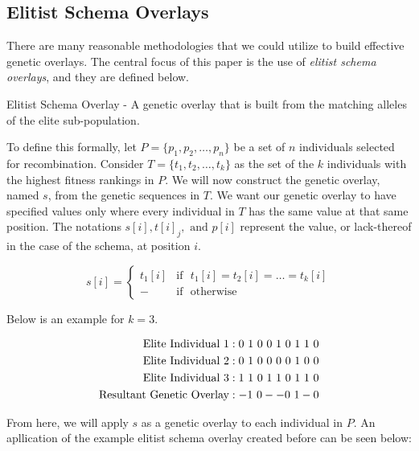 \subsection*{Elitist Schema Overlays}
There are many reasonable methodologies that we could utilize to build effective genetic overlays. The central focus of this paper is the use of \emph{elitist schema overlays}, and they are defined below.

\begin{overlay}
Elitist Schema Overlay - A genetic overlay that is built from the matching alleles of the elite sub-population.
\end{overlay}

To define this formally, let $P = \{p_1,p_2,\ldots,p_n\}$ be a set of $n$ individuals selected for recombination. Consider $T=\{t_1,t_2,\ldots,t_k\}$ as the set of the $k$ individuals with the highest fitness rankings in $P$. We will now construct the genetic overlay, named $s$, from the genetic sequences in $T$. We want our genetic overlay to  have specified values only where every individual in $T$ has the same value at that same position. The notations $s[i], t[i]_j, \text{ and } p[i]$ represent the value, or lack-thereof in the case of the schema, at position $i$. 
 
 \begin{displaymath}
   s[i] = \left\{
     \begin{array}{cl}
       t_1[i] & \text{if~ } t_1[i] = t_2[i] = \ldots = t_k[i] \\
       - & \text{if~ } \text{otherwise} 
     \end{array}
   \right.
\end{displaymath} 

\noindent Below is an example for $k = 3$.

\begin{displaymath}
\centering 
\begin{align*}
\text{Elite Individual 1} &: 0~1~0~0~1~0~1~1~0 			\\
\text{Elite Individual 2} &: 0~1~0~0~0~0~1~0~0 			\\
\text{Elite Individual 3} &: 1~1~0~1~1~0~1~1~0 			\\  
\text{Resultant Genetic Overlay} &:   -1~0--0~1-0			
\end{align*}
\end{displaymath}

From here, we will apply $s$ as a genetic overlay to each individual in $P$. An apllication of the example elitist schema overlay created before can be seen below:

